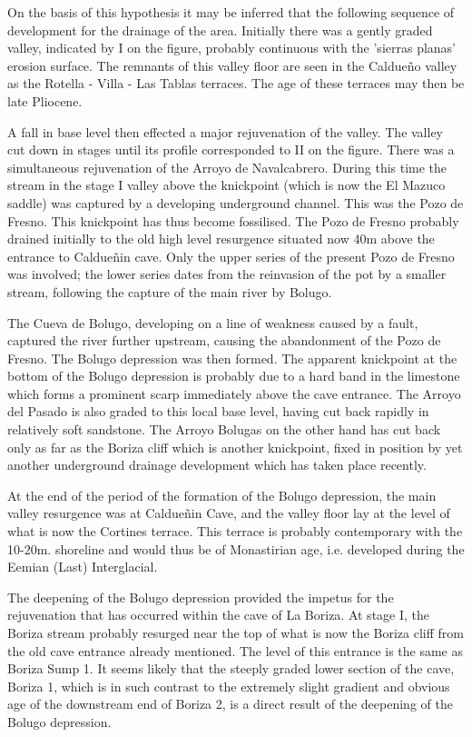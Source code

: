 \documentclass[11pt, a4paper, twoside]{memoir}
\begin{document}
On the basis of this hypothesis it may be inferred that the following sequence of development for the drainage of the area. Initially there was a gently graded valley, indicated by I on the figure, probably continuous with the 'sierras planas' erosion surface. The remnants of this valley floor are seen in the Caldueño valley as the Rotella - Villa - Las Tablas terraces. The age of these terraces may then be late Pliocene.

A fall in base level then effected a major rejuvenation of the valley. The valley cut down in stages until its profile corresponded to II on the figure. There was a simultaneous rejuvenation of the Arroyo de Navalcabrero. During this time the stream in the stage I valley above the knickpoint (which is now the El Mazuco saddle) was captured by a developing underground channel. This was the Pozo de Fresno. This knickpoint has thus become fossilised. The Pozo de Fresno probably drained initially to the old high level resurgence situated now 40m above the entrance to Caldueñin cave. Only the upper series of the present Pozo de Fresno was involved; the lower series dates from the reinvasion of the pot by a smaller stream, following the capture of the main river by Bolugo.

The Cueva de Bolugo, developing on a line of weakness caused by a fault, captured the river further upstream, causing the abandonment of the Pozo de Fresno. The Bolugo depression was then formed. The apparent knickpoint at the bottom of the Bolugo depression is probably due to a hard band in the limestone which forms a prominent scarp immediately above the cave entrance. The Arroyo del Pasado is also graded to this local base level, having cut back rapidly in relatively soft sandstone. The Arroyo Bolugas on the other hand has cut back only as far as the Boriza cliff which is another knickpoint, fixed in position by yet another underground drainage development which has taken place recently.

At the end of the period of the formation of the Bolugo depression, the main valley resurgence was at Caldueñin Cave, and the valley floor lay at the level of what is now the Cortines terrace. This terrace is probably contemporary with the 10-20m. shoreline and would thus be of Monastirian age, i.e. developed during the Eemian (Last) Interglacial.

The deepening of the Bolugo depression provided the impetus for the rejuvenation that has occurred within the cave of La Boriza. At stage I, the Boriza stream probably resurged near the top of what is now the Boriza cliff from the old cave entrance already mentioned. The level of this entrance is the same as Boriza Sump 1. It seems likely that the steeply graded lower section of the cave, Boriza 1, which is in such contrast to the extremely slight gradient and obvious age of the downstream end of Boriza 2, is a direct result of the deepening of the Bolugo depression.
\end{document}
